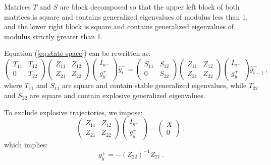\documentclass[11pt,a4paper]{article}
\begin{document}
Matrices $T$ and $S$ are block decomposed so that the upper left block of both
matrices is square and contains generalized eigenvalues of modulus less than 1,
and the lower right block is square and contains generalized eigenvalues of
modulus strictly greater than 1.

Equation (\ref{eq:state-space}) can be rewritten as:
\begin{equation}
  \label{eq:state-space-qz}
  \left(
    \begin{matrix}
      T_{11} & T_{12} \\
      0 & T_{22}
    \end{matrix}
  \right)
  \left(
    \begin{matrix}
      Z_{11} & Z_{12} \\
      Z_{21} & Z_{22}
    \end{matrix}
  \right)
  \left(
    \begin{matrix}
      I_{n^-} \\
      g^+_y
    \end{matrix}
  \right)
  \hat{y}^-_t
  =
  \left(
    \begin{matrix}
      S_{11} & S_{12} \\
      0 & S_{22}
    \end{matrix}
  \right)
  \left(
    \begin{matrix}
      Z_{11} & Z_{12} \\
      Z_{21} & Z_{22}
    \end{matrix}
  \right)
  \left(
    \begin{matrix}
      I_{n^-} \\
      g^+_y
    \end{matrix}
  \right)
  \hat{y}^-_{t-1} \: ,
\end{equation}
where $T_{11}$ and $S_{11}$ are square and contain stable generalized
eigenvalues, while $T_{22}$ and $S_{22}$ are square and contain explosive
generalized eigenvalues.

To exclude explosive trajectories, we impose:
\begin{equation}
  \label{eq:non-explosive}
  \left(
    \begin{matrix}
      Z_{11} & Z_{12} \\
      Z_{21} & Z_{22}
    \end{matrix}
  \right)
  \left(
    \begin{matrix}
      I_{n^-} \\
      g^+_y
    \end{matrix}
  \right)
  =
  \left(
    \begin{matrix}
      X \\
      0
    \end{matrix}
  \right) \: ,
\end{equation}
which implies:
\begin{equation*}
  g^+_y = -(Z_{22})^{-1} Z_{21} \: .
\end{equation*}
\end{document}
